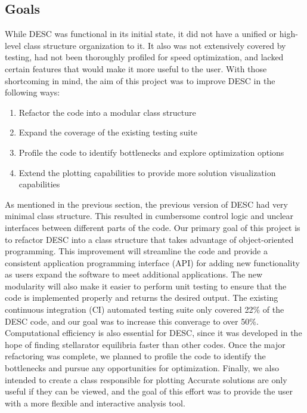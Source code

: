 \documentclass{article}
\begin{document}
\subsection{Goals}

While DESC was functional in its initial state, it did not have a unified or high-level class structure organization to it.
It also was not extensively covered by testing, had not been thoroughly profiled for speed optimization, and lacked certain features that would make it more useful to the user.
With those shortcoming in mind, the aim of this project was to improve DESC in the following ways:
%
\begin{enumerate}
\item Refactor the code into a modular class structure
\item Expand the coverage of the existing testing suite
\item Profile the code to identify bottlenecks and explore optimization options
\item Extend the plotting capabilities to provide more solution visualization capabilities
\end{enumerate}

As mentioned in the previous section, the previous version of DESC had very minimal class structure.
This resulted in cumbersome control logic and unclear interfaces between different parts of the code.
Our primary goal of this project is to refactor DESC into a class structure that takes advantage of object-oriented programming.
This improvement will streamline the code and provide a consistent application programming interface (API) for adding new functionality as users expand the software to meet additional applications.
The new modularity will also make it easier to perform unit testing to ensure that the code is implemented properly and returns the desired output.
The existing continuous integration (CI) automated testing suite only covered 22\% of the DESC code, and our goal was to increase this converage to over 50\%.
Computational efficiency is also essential for DESC, since it was developed in the hope of finding stellarator equilibria faster than other codes.
Once the major refactoring was complete, we planned to profile the code to identify the bottlenecks and pursue any opportunities for optimization.
Finally, we also intended to create a class responsible for plotting
Accurate solutions are only useful if they can be viewed, and the goal of this effort was to provide the user with a more flexible and interactive analysis tool.
\end{document}
